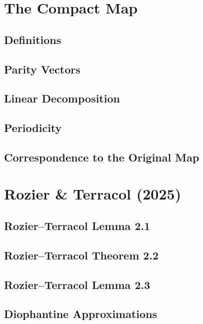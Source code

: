 \chapter{The Compact Map}
\section{Definitions}


\section{Parity Vectors}


\section{Linear Decomposition}


\section{Periodicity}


\section{Correspondence to the Original Map}


\chapter{Rozier \& Terracol (2025)}
\section{Rozier--Terracol Lemma 2.1}


\section{Rozier--Terracol Theorem 2.2}


\section{Rozier--Terracol Lemma 2.3}


\section{Diophantine Approximations}


